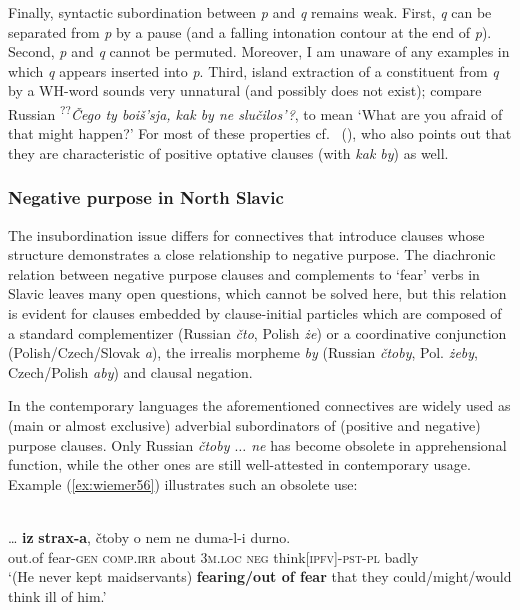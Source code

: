 \documentclass[output=paper,colorlinks,citecolor=brown]{langscibook}
\begin{document}
Finally, syntactic subordination between \textit{p} and \textit{q} remains weak. First, \textit{q} can be separated from \textit{p} by a pause (and a falling intonation contour at the end of \textit{p}). Second, \textit{p} and \textit{q} cannot be permuted. Moreover, I am unaware of any examples in which \textit{q} appears inserted into \textit{p}. Third, island extraction of a constituent from \textit{q} by a WH-word sounds very unnatural (and possibly does not exist); compare Russian \textsuperscript{??}\textit{Čego ty boiš'sja, kak by ne slučilos'?}, to mean `What are you afraid of that might happen?' For most of these properties cf.\ \citeauthor{Dobrushina2016} (\citeyear[344--345]{Dobrushina2016}), who also points out that they are characteristic of positive optative clauses (with \textit{kak by}) as well.



\subsubsection{Negative purpose in North Slavic}
\label{subsubsec:negpurpose}


\noindent The insubordination issue differs for connectives that introduce clauses whose structure demonstrates a close relationship to negative purpose. The diachronic relation between negative purpose clauses and complements to `fear' verbs in Slavic leaves many open questions, which cannot be solved here, but this relation is evident for clauses embedded by clause-initial particles which are composed of a standard complementizer (Russian \textit{čto}, Polish \textit{że}) or a coordinative conjunction (Polish/Czech/Slovak \textit{a}), the irrealis morpheme \textit{by} (Russian \textit{čtoby}, Pol. \textit{żeby}, Czech/Polish \textit{aby}) and clausal negation.

In the contemporary languages the aforementioned connectives are widely used as (main or almost exclusive) adverbial subordinators of (positive and negative) purpose clauses. Only Russian \textit{čtoby $\ldots$ ne} has become obsolete in apprehensional function, while the other ones are still well{}-attested in contemporary usage. Example (\ref{ex:wiemer56}) illustrates such an obsolete use:

\ea 
\label{ex:wiemer56} 
 \\
\gll \ldots{} \textbf{iz} \textbf{strax-a}, čtoby o nem ne duma-l-i durno. \\
{} out.of fear-\textsc{gen} \textsc{comp.irr} about \textsc{3m.loc} \textsc{neg} think\textsc{[ipfv]-pst-pl} badly \\
\glt `(He never kept maidservants) \textbf{fearing/out of fear} that they could/might/would think ill of him.' \\
\z
\end{document}
